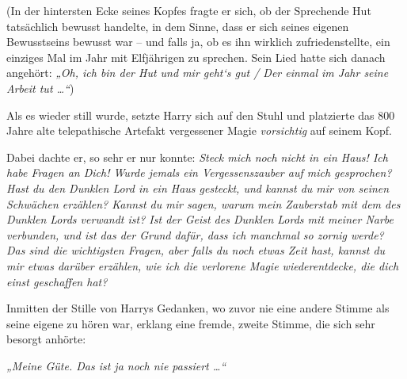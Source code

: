 (In der hintersten Ecke seines Kopfes fragte er sich, ob der Sprechende Hut tatsächlich bewusst handelte, in dem Sinne, dass er sich seines eigenen Bewusstseins bewusst war – und falls ja, ob es ihn wirklich zufriedenstellte, ein einziges Mal im Jahr mit Elfjährigen zu sprechen. Sein Lied hatte sich danach angehört: \emph{„Oh, ich bin der Hut und mir geht‘s gut / Der einmal im Jahr seine Arbeit tut …“})

Als es wieder still wurde, setzte Harry sich auf den Stuhl und platzierte das 800 Jahre alte telepathische Artefakt vergessener Magie \emph{vorsichtig} auf seinem Kopf.

Dabei dachte er, so sehr er nur konnte: \emph{Steck mich noch nicht in ein Haus! Ich habe Fragen an Dich! Wurde jemals ein Vergessenszauber auf mich gesprochen? Hast du den Dunklen Lord in ein Haus gesteckt, und kannst du mir von seinen Schwächen erzählen? Kannst du mir sagen, warum mein Zauberstab mit dem des Dunklen Lords verwandt ist? Ist der Geist des Dunklen Lords mit meiner Narbe verbunden, und ist das der Grund dafür, dass ich manchmal so zornig werde? Das sind die wichtigsten Fragen, aber falls du noch etwas Zeit hast, kannst du mir etwas darüber erzählen, wie ich die verlorene Magie wiederentdecke, die dich einst geschaffen hat?}

Inmitten der Stille von Harrys Gedanken, wo zuvor nie eine andere Stimme als seine eigene zu hören war, erklang eine fremde, zweite Stimme, die sich sehr besorgt anhörte:

\emph{„Meine Güte. Das ist ja noch nie passiert …“}
